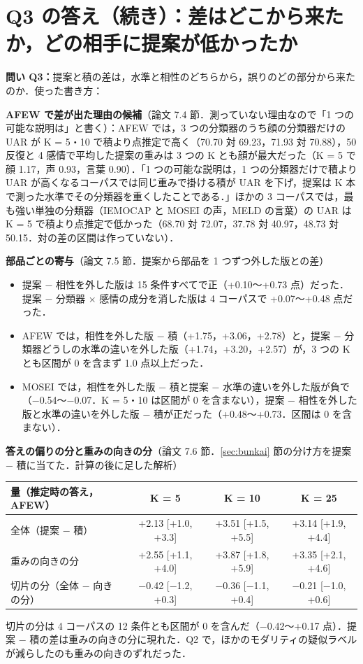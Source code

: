 \documentclass[a4paper,10pt]{ltjsarticle}
\newcommand{\toihead}[4][]{\begin{headbar}[#2]\textbf{\textcolor{#2}{問い #3：}}#4\if\relax\detokenize{#1}\relax\else\hfill{\small 使った書き方：}#1\fi\end{headbar}}
\newcommand{\pagesection}[1]{\clearpage\section{#1}}
\newcommand{\shiryo}[1]{\ref{#1} 節}
\begin{document}
\pagesection{Q3 の答え（続き）：差はどこから来たか，どの相手に提案が低かったか}\label{sec:q3cont}
\toihead{cQ3}{Q3}{提案と積の差は，水準と相性のどちらから，誤りのどの部分から来たのか．}

\noindent\textbf{AFEW で差が出た理由の候補}（論文 7.4 節．測っていない理由なので「1 つの可能な説明は」と書く）：AFEW では，3 つの分類器のうち顔の分類器だけの UAR が K = 5・10 で積より点推定で高く（70.70 対 69.23，71.93 対 70.88），50 反復と 4 感情で平均した提案の重みは 3 つの K とも顔が最大だった（K = 5 で顔 1.17，声 0.93，言葉 0.90）．「1 つの可能な説明は，1 つの分類器だけで積より UAR が高くなるコーパスでは同じ重みで掛ける積が UAR を下げ，提案は K 本で測った水準でその分類器を重くしたことである．」ほかの 3 コーパスでは，最も強い単独の分類器（IEMOCAP と MOSEI の声，MELD の言葉）の UAR は K = 5 で積より点推定で低かった（68.70 対 72.07，37.78 対 40.97，48.73 対 50.15．対の差の区間は作っていない）．

\medskip
\noindent\textbf{部品ごとの寄与}（論文 7.5 節．提案から部品を 1 つずつ外した版との差）
\begin{itemize}
  \item 提案 − 相性を外した版は 15 条件すべてで正（+0.10〜+0.73 点）だった．提案 − 分類器 × 感情の成分を消した版は 4 コーパスで +0.07〜+0.48 点だった．
  \item AFEW では，相性を外した版 − 積（+1.75，+3.06，+2.78）と，提案 − 分類器どうしの水準の違いを外した版（+1.74，+3.20，+2.57）が，3 つの K とも区間が 0 を含まず 1.0 点以上だった．
  \item MOSEI では，相性を外した版 − 積と提案 − 水準の違いを外した版が負で（−0.54〜−0.07．K = 5・10 は区間が 0 を含まない），提案 − 相性を外した版と水準の違いを外した版 − 積が正だった（+0.48〜+0.73．区間は 0 を含まない）．
\end{itemize}

\noindent\textbf{答えの偏りの分と重みの向きの分}（論文 7.6 節．\shiryo{sec:bunkai}の分け方を提案 − 積に当てた．計算の後に足した解析）
\begin{center}
\small
\begin{tabular}{lccc}
\toprule
量（推定時の答え，AFEW） & K = 5 & K = 10 & K = 25 \\
\midrule
全体（提案 − 積） & +2.13 [+1.0, +3.3] & +3.51 [+1.5, +5.5] & +3.14 [+1.9, +4.4] \\
重みの向きの分 & +2.55 [+1.1, +4.0] & +3.87 [+1.8, +5.9] & +3.35 [+2.1, +4.6] \\
切片の分（全体 − 向きの分） & −0.42 [−1.2, +0.3] & −0.36 [−1.1, +0.4] & −0.21 [−1.0, +0.6] \\
\bottomrule
\end{tabular}
\end{center}
\noindent 切片の分は 4 コーパスの 12 条件とも区間が 0 を含んだ（−0.42〜+0.17 点）．提案 − 積の差は重みの向きの分に現れた．Q2 で，ほかのモダリティの疑似ラベルが減らしたのも重みの向きのずれだった．
\end{document}
